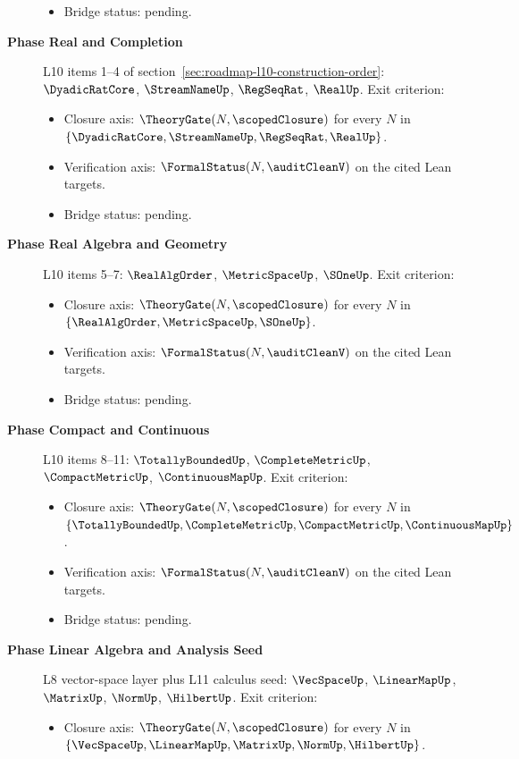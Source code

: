 \begin{description}
\begin{itemize}
      \item Bridge status: pending.
    \end{itemize}
  \item[\textbf{Phase Real and Completion}] L10 items 1--4 of section~\ref{sec:roadmap-l10-construction-order}: $\DyadicRatCore$, $\StreamNameUp$, $\RegSeqRat$, $\RealUp$. Exit criterion:
    \begin{itemize}
      \item Closure axis: $\TheoryGate(N, \scopedClosure)$ for every $N$ in $\{\DyadicRatCore, \StreamNameUp, \RegSeqRat, \RealUp\}$.
      \item Verification axis: $\FormalStatus(N, \auditCleanV)$ on the cited Lean targets.
      \item Bridge status: pending.
    \end{itemize}
  \item[\textbf{Phase Real Algebra and Geometry}] L10 items 5--7: $\RealAlgOrder$, $\MetricSpaceUp$, $\SOneUp$. Exit criterion:
    \begin{itemize}
      \item Closure axis: $\TheoryGate(N, \scopedClosure)$ for every $N$ in $\{\RealAlgOrder, \MetricSpaceUp, \SOneUp\}$.
      \item Verification axis: $\FormalStatus(N, \auditCleanV)$ on the cited Lean targets.
      \item Bridge status: pending.
    \end{itemize}
  \item[\textbf{Phase Compact and Continuous}] L10 items 8--11: $\TotallyBoundedUp$, $\CompleteMetricUp$, $\CompactMetricUp$, $\ContinuousMapUp$. Exit criterion:
    \begin{itemize}
      \item Closure axis: $\TheoryGate(N, \scopedClosure)$ for every $N$ in $\{\TotallyBoundedUp, \CompleteMetricUp, \CompactMetricUp, \ContinuousMapUp\}$.
      \item Verification axis: $\FormalStatus(N, \auditCleanV)$ on the cited Lean targets.
      \item Bridge status: pending.
    \end{itemize}
  \item[\textbf{Phase Linear Algebra and Analysis Seed}] L8 vector-space layer plus L11 calculus seed: $\VecSpaceUp$, $\LinearMapUp$, $\MatrixUp$, $\NormUp$, $\HilbertUp$. Exit criterion:
    \begin{itemize}
      \item Closure axis: $\TheoryGate(N, \scopedClosure)$ for every $N$ in $\{\VecSpaceUp, \LinearMapUp, \MatrixUp, \NormUp, \HilbertUp\}$.

\end{itemize}
\end{description}
